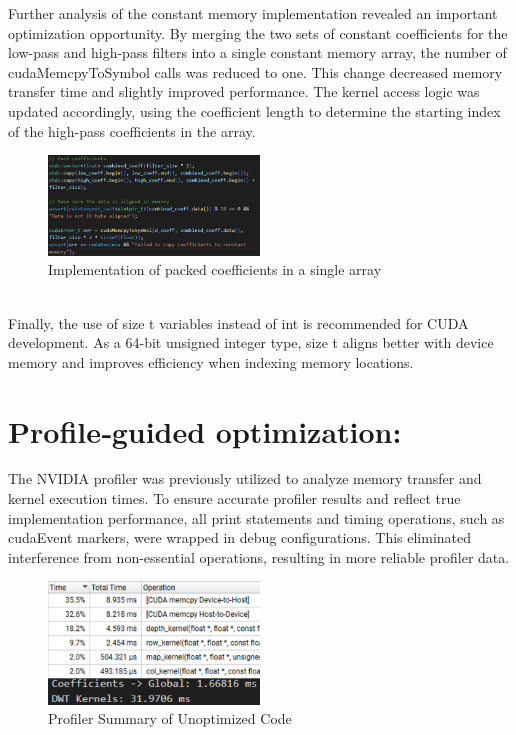 \documentclass[journal,11pt]{IEEEtran}
\begin{document}
Further analysis of the constant memory implementation revealed an important optimization opportunity. By merging the two sets of constant coefficients for the low-pass and high-pass filters into a single constant memory array, the number of cudaMemcpyToSymbol calls was reduced to one. This change decreased memory transfer time and slightly improved performance. The kernel access logic was updated accordingly, using the coefficient length to determine the starting index of the high-pass coefficients in the array.
\vspace{-1.2em}
\begin{figure}[h]
\centering
\includegraphics[width=0.5\textwidth]{assets/packed-coeffs.png}
\caption{Implementation of packed coefficients in a single array}
\label{fig:8}
\end{figure}
\vspace{-0.5em}\\
Finally, the use of size t variables instead of int is recommended for CUDA development. As a 64-bit unsigned integer type, size t aligns better with device memory and improves efficiency when indexing memory locations.

\section{Profile‐guided optimization:}
The NVIDIA profiler was previously utilized to analyze memory transfer and kernel execution times. To ensure accurate profiler results and reflect true implementation performance, all print statements and timing operations, such as cudaEvent markers, were wrapped in debug configurations. This eliminated interference from non-essential operations, resulting in more reliable profiler data.

\begin{figure}[h]
    \centering
    \includegraphics[width=0.5\textwidth]{assets/unoptim-sum.png}
    \caption{Profiler Summary of Unoptimized Code}
    \label{fig:9}
\end{figure}
\end{document}

